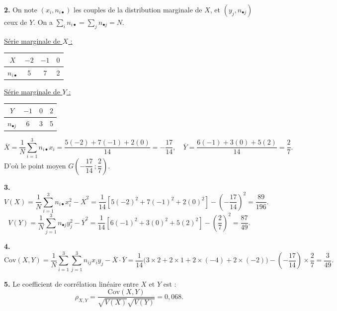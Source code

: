 \documentclass[11pt]{article}
\begin{document}
\textbf{2.} On note $(x_i, n_{i\bullet})$ les couples de la distribution marginale de $X$, et $(y_j, n_{\bullet j})$ ceux de $Y$. On a $\sum_i n_{i\bullet} = \sum_j n_{\bullet j} = N$.

\underline{Série marginale de $X$ :}
\begin{center}\renewcommand{\arraystretch}{1.3}
\begin{tabular}{|c|c|c|c|}\hline $X$ & $-2$ & $-1$ & $0$ \\\hline $n_{i\bullet}$ & 5 & 7 & 2 \\\hline\end{tabular}
\end{center}
\underline{Série marginale de $Y$ :}
\begin{center}\renewcommand{\arraystretch}{1.3}
\begin{tabular}{|c|c|c|c|}\hline $Y$ & $-1$ & $0$ & $2$ \\\hline $n_{\bullet j}$ & 6 & 3 & 5 \\\hline\end{tabular}
\end{center}
\[ \overline{X} = \frac{1}{N}\sum_{i=1}^3 n_{i\bullet}x_i = \frac{5(-2) + 7(-1) + 2(0)}{14} = -\frac{17}{14}, \quad \overline{Y} = \frac{6(-1) + 3(0) + 5(2)}{14} = \frac{2}{7}. \]
D'où le point moyen $G\left(-\dfrac{17}{14}\,;\dfrac{2}{7}\right)$.

\textbf{3.}
\[ V(X) = \frac{1}{N}\sum_{i=1}^3 n_{i\bullet}x_i^2 - \overline{X}^2 = \frac{1}{14}\left[5(-2)^2 + 7(-1)^2 + 2(0)^2\right] - \left(-\frac{17}{14}\right)^2 = \frac{89}{196}. \]
\[ V(Y) = \frac{1}{N}\sum_{j=1}^3 n_{\bullet j}y_j^2 - \overline{Y}^2 = \frac{1}{14}\left[6(-1)^2 + 3(0)^2 + 5(2)^2\right] - \left(\frac{2}{7}\right)^2 = \frac{87}{49}. \]

\textbf{4.}
\[ \mathrm{Cov}(X, Y) = \frac{1}{N}\sum_{i=1}^3\sum_{j=1}^3 n_{ij}x_i y_j - \overline{X}\cdot\overline{Y} = \frac{1}{14}\big(3 \times 2 + 2 \times 1 + 2 \times (-4) + 2 \times (-2)\big) - \left(-\frac{17}{14}\right) \times \frac{2}{7} = \frac{3}{49}. \]

\textbf{5.} Le coefficient de corrélation linéaire entre $X$ et $Y$ est :
\[ \rho_{X,Y} = \frac{\mathrm{Cov}(X, Y)}{\sqrt{V(X)}\sqrt{V(Y)}} = 0{,}068. \]

\prob{}
\end{document}
